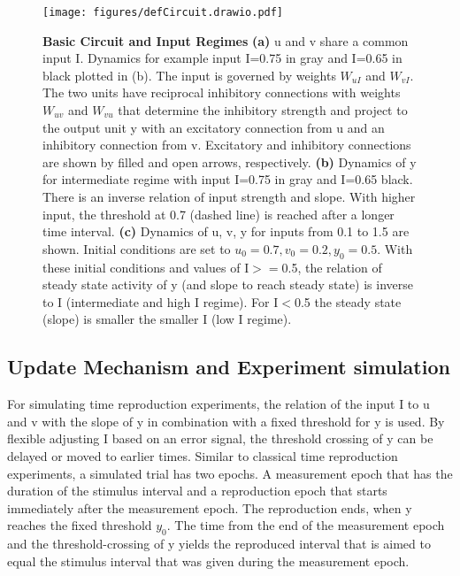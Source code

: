 \documentclass[9pt]{article}
\begin{document}
\begin{figure}[h]
	\centering
	\texttt{[image: figures/defCircuit.drawio.pdf]}
	\caption{\textbf{Basic Circuit and Input Regimes} \textbf{(a)} u and v share a common input I. Dynamics for example input I=0.75 in gray and I=0.65 in black plotted in (b). The input is governed by weights $W_{uI}$ and $W_{vI}$. The two units have reciprocal inhibitory connections with weights $W_{uv}$ and $W_{vu}$ that determine the inhibitory strength and project to the output unit y with an excitatory connection from u and an inhibitory connection from v. Excitatory and inhibitory connections are shown by filled and open arrows, respectively. \textbf{(b)} Dynamics of y for intermediate regime with input I=0.75 in gray and I=0.65 black. There is an inverse relation of input strength and slope. With higher input, the threshold at 0.7 (dashed line) is reached after a longer time interval. \textbf{(c)} Dynamics of u, v, y for inputs from 0.1 to 1.5 are shown. Initial conditions are set to $u_0=0.7 , v_0=0.2 , y_0=0.5$. With these initial conditions and values of I$>=$0.5, the relation of steady state activity of y (and slope to reach steady state) is inverse to I (intermediate and high I regime). For I$<$0.5 the steady state (slope) is smaller the smaller I (low I regime).}
\label{fig:circuit}
\end{figure}


\subsection{Update Mechanism and Experiment simulation}
For simulating time reproduction experiments, the relation of the input I to u and v with the slope of y in combination with a fixed threshold for y is used.
By flexible adjusting I based on an error signal, the threshold crossing of y can be delayed or moved to earlier times.
Similar to classical time reproduction experiments, a simulated trial has two epochs. A measurement epoch that has the duration of the stimulus interval and a reproduction epoch that starts immediately after the measurement epoch. The reproduction ends, when y reaches the fixed threshold $y_0$. The time from the end of the measurement epoch and the threshold-crossing of y yields the reproduced interval that is aimed to equal the stimulus interval that was given during the measurement epoch.
\end{document}

